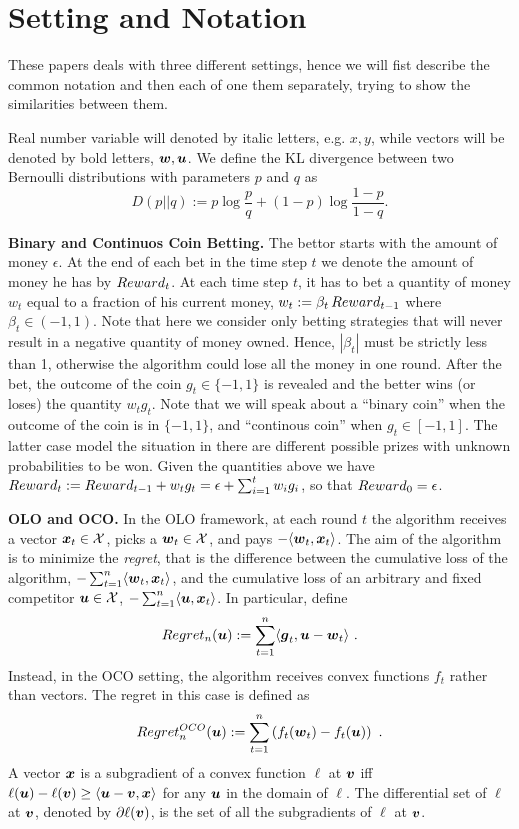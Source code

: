 \section{Setting and Notation}
These papers deals with three different settings, hence we will fist describe the common notation and then each of one them separately, trying to show the similarities between them.

Real number variable will denoted by italic letters, e.g. $x,y$, while vectors will be denoted by bold letters, $\boldsymbol{w},\boldsymbol{u}$.
We define the KL divergence between two Bernoulli distributions with parameters $p$ and $q$ as
\[
D(p||q) := p \log\frac{p}{q} + (1-p) \log\frac{1-p}{1-q}.
\]

\textbf{Binary and Continuos Coin Betting.}
The bettor starts with the amount of money $\epsilon$. 
At the end of each bet in the time step $t$ we denote the amount of money he has by $Reward_t$.
At each time step $t$, it has to bet a quantity of money $w_t$ equal to a fraction of his current money, $w_t:=\beta_t \, Reward_{t-1}$ where $\beta_t \in (-1,1)$. Note that here we consider only betting strategies that will never result in a negative quantity of money owned. Hence, $|\beta_t|$ must be strictly less than 1, otherwise the algorithm could lose all the money in one round.
After the bet, the outcome of the coin $g_t \in \{-1,1\}$ is revealed and the better wins (or loses) the quantity $w_t g_t$.
Note that we will speak about a ``binary coin'' when the outcome of the coin is in $\{-1,1\}$, and ``continous coin'' when $g_t \in [-1,1]$. The latter case model the situation in there are different possible prizes with unknown probabilities to be won. Given the quantities above we have $Reward_t:=Reward_{t-1} + w_t g_t = \epsilon + \sum_{i=1}^t w_i g_i$, so that $Reward_0=\epsilon$.

\textbf{\ac{OLO} and \ac{OCO}.}
In the \ac{OLO} framework, at each round $t$ the algorithm receives a vector $\boldsymbol{x}_t \in \mathcal{X}$, picks a $\boldsymbol{w}_t \in \mathcal{X}$, and pays $-\langle \boldsymbol{w}_t,\boldsymbol{x}_t \rangle$.
The aim of the algorithm is to minimize the \emph{regret}, that is the difference between the cumulative loss of the algorithm, $-\sum_{t=1}^n \langle \boldsymbol{w}_t,\boldsymbol{x}_t \rangle$, and the cumulative loss of an arbitrary and fixed competitor $\boldsymbol{u} \in \mathcal{X}$, $-\sum_{t=1}^n \langle \boldsymbol{u},\boldsymbol{x}_t \rangle$.
In particular, define
\[
Regret_n(\boldsymbol{u}) := \sum_{t=1}^n \langle \boldsymbol{g}_t , \boldsymbol{u} - \boldsymbol{w}_t \rangle~.
\]
Instead, in the \ac{OCO} setting, the algorithm receives convex functions $f_t$ rather than vectors.
The regret in this case is defined as
\[
Regret^{OCO}_n(\boldsymbol{u}) := \sum_{t=1}^n \left(f_t(\boldsymbol{w}_t) -f_t(\boldsymbol{u})\right)~.
\]
A vector $\boldsymbol{x}$ is a subgradient of a convex function $\ell$ at $\boldsymbol{v}$ iff $\ell(\boldsymbol{u}) - \ell(\boldsymbol{v}) \ge \langle \boldsymbol{u} - \boldsymbol{v}, \boldsymbol{x} \rangle$ for any $\boldsymbol{u}$ in the domain of $\ell$. The differential set of $\ell$ at $\boldsymbol{v}$, denoted by $\partial \ell(\boldsymbol{v})$, is the set of all the subgradients of $\ell$ at $\boldsymbol{v}$.

